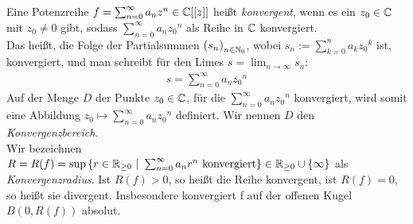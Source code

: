 %
%
\begin{defn}\label{konvergenz}
Eine Potenzreihe $f = \sum_{n= 0}^{\infty}a_nz^n \in \mathbb{C}[[z]]$ heißt \textit{konvergent}, wenn es ein $z_0\in \mathbb{C}$ mit $z_0 \neq 0$ gibt, sodass $\sum_{n=0}^{\infty}a_n{z_0}^n$ als Reihe in $\mathbb{C}$ konvergiert. \\
Das heißt, die Folge  der Partialsummen $\left(s_n\right)_{n\in\mathbb{N}_0}$, wobei $s_n:= \sum_{k=0}^{n}a_k{z_0}^k$ ist, konvergiert, und man schreibt für den Limes $s = \lim_{n \to \infty}s_n$:
\begin{align}
s= \sum_{n=0}^{\infty}a_n{z_0}^n
\end{align}
Auf der Menge $D$ der Punkte $z_0 \in \mathbb{C}$, für die $\sum_{n=0}^{\infty}a_n{z_0}^n$ konvergiert, wird somit eine Abbildung $z_0 \mapsto \sum_{n=0}^{\infty}a_n{z_0}^n $ definiert. Wir nennen $D$ den \textit{Konvergenzbereich}. \\
Wir bezeichnen $R = R(f) = \sup{\lbrace r\in \mathbb{R}_{\geq 0} ~|~ \sum_{n=0}^{\infty}a_n{r}^n \text{ konvergiert}\rbrace } \in \mathbb{R}_{\geq 0}\cup \lbrace\infty\rbrace$ als \textit{Konvergenzradius}. Ist $R(f) >0 $, so heißt die Reihe konvergent, ist $R(f)= 0 $, so heißt sie divergent.
Insbesondere konvergiert f auf der offenen Kugel $B(0,R(f))$ absolut.
%
%
\end{defn}


